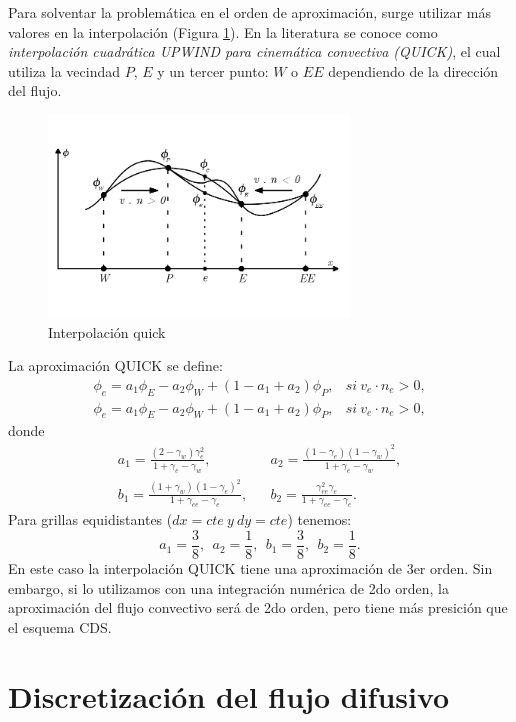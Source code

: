\documentclass[a4paper,10pt, oneside]{book}
\begin{document}
Para solventar la problemática en el orden de aproximación, surge utilizar más valores en la interpolación (Figura \ref{img:4-11}). En la literatura se conoce como \textit{interpolación cuadrática UPWIND para cinemática convectiva (QUICK)}, el cual utiliza la vecindad $P$, $E$ y un tercer punto: $W$ o $EE$ dependiendo de la dirección del flujo. 
\begin{figure}[h!]
	\centering
	\includegraphics[width=8cm]{Img/4-11}
	\caption{Interpolación quick}
	\label{img:4-11}
\end{figure}

La aproximación QUICK se define:
\begin{eqnarray}
	\phi_e = a_1 \phi_E - a_2 \phi_W + (1 - a_1 + a_2)\phi_P, & si \ v_e \cdot n_e > 0, \nonumber \\
	\phi_e = a_1 \phi_E - a_2 \phi_W + (1 - a_1 + a_2)\phi_P, & si \ v_e \cdot n_e > 0, \nonumber
\end{eqnarray}
donde
\begin{eqnarray}
	a_1 = \frac{(2-\gamma_w)\gamma_e^2}{1+\gamma_e -\gamma_w}, & & a_2 = \frac{(1-\gamma_e)(1-\gamma_w)^2}{1+\gamma_e-\gamma_w}, \nonumber \\
	b_1 = \frac{(1+\gamma_w)(1-\gamma_e)^2}{1+\gamma_{ee} - \gamma_e}, & & b_2 = \frac{\gamma_{ee}^2 \gamma_e}{1+\gamma_{ee}-\gamma_e}. \nonumber
\end{eqnarray}
Para grillas equidistantes ($dx = cte \ y \ dy = cte$) tenemos:
\begin{equation}
	a_1 = \frac{3}{8}, \ \ a_2 = \frac{1}{8}, \ \ b_1 = \frac{3}{8}, \ \ b_2 = \frac{1}{8}. \nonumber
\end{equation}
En este caso la interpolación QUICK tiene una aproximación de 3er orden. Sin embargo, si lo utilizamos con una integración numérica de 2do orden, la aproximación del flujo convectivo será de 2do orden, pero tiene más presición que el esquema CDS.

\section{Discretización del flujo difusivo}
\end{document}
